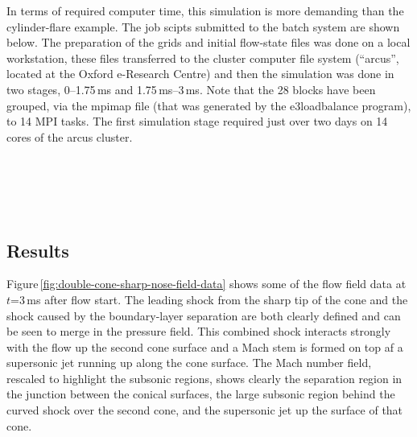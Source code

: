 \medskip
In terms of required computer time, this simulation is more demanding than the cylinder-flare example.
The job scipts submitted to the batch system are shown below.
The preparation of the grids and initial flow-state files was done on a local workstation, 
these files transferred to the cluster computer file system (``arcus'', located at the Oxford e-Research Centre)
and then the simulation was done in two stages, 
0--1.75\,ms and 1.75\,ms--3\,ms.
Note that the 28 blocks have been grouped, via the mpimap file 
(that was generated by the e3loadbalance program), to 14 MPI tasks.
The first simulation stage required just over two days on 14 cores of the arcus cluster.

\noindent
\topbar
{}
\bottombar\\
\topbar
{}
\bottombar\\
\topbar

\bottombar\\

\clearpage
\subsection{Results}
%
Figure\,\ref{fig:double-cone-sharp-nose-field-data} shows some of the flow field data at $t$=3\,ms after flow start.
The leading shock from the sharp tip of the cone and the shock caused by the boundary-layer separation 
are both clearly defined and can be seen to merge in the pressure field.
This combined shock interacts strongly with the flow up the second cone surface and a Mach stem is formed 
on top af a supersonic jet running up along the cone surface.
The Mach number field, rescaled to highlight the subsonic regions, shows clearly the separation region in the
junction between the conical surfaces, the large subsonic region behind the curved shock over the second cone, 
and the supersonic jet up the surface of that cone.

